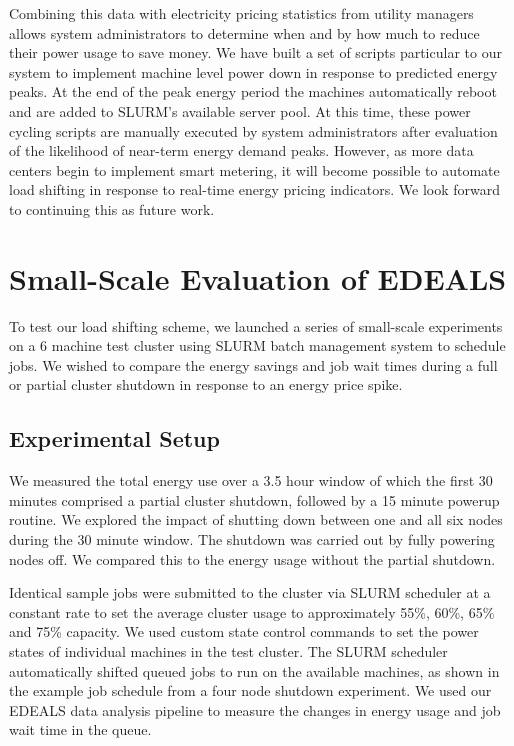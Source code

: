 Combining this data with electricity pricing statistics from utility managers allows system administrators to determine when and by how much to reduce their power usage to save money.  We have built a set of scripts particular to our system to implement machine level power down in response to predicted energy peaks.  At the end of the peak energy period the machines automatically reboot and are added to SLURM’s available server pool.  At this time, these power cycling scripts are manually executed by system administrators after evaluation of the likelihood of near-term energy demand peaks.  However, as more data centers begin to implement smart metering, it will become possible to automate load shifting in response to real-time energy pricing indicators.  We look forward to continuing this as future work.





\section{Small-Scale Evaluation of EDEALS}

To test our load shifting scheme, we launched a series of small-scale experiments on a 6 machine test cluster using SLURM batch management system to schedule jobs. We wished to compare the energy savings and job wait times during a full or partial cluster shutdown in response to an energy price spike.

\subsection{Experimental Setup}

We measured the total energy use over a 3.5 hour window of which the first 30 minutes comprised a partial cluster shutdown, followed by a 15 minute powerup routine. We explored the impact of shutting down between one and all six nodes during the 30 minute window. The shutdown was carried out by fully powering nodes off.  We compared this to the energy usage without the partial shutdown.

Identical sample jobs were submitted to the cluster via SLURM scheduler at a constant rate to set the average cluster usage to approximately 55\%, 60\%, 65\% and 75\% capacity.  We used custom state control commands to set the power states of individual machines in the test cluster.  The SLURM scheduler automatically shifted queued jobs to run on the available machines, as shown in the example job schedule from a four node shutdown experiment. We used our EDEALS data analysis pipeline to measure the changes in energy usage and job wait time in the queue.

